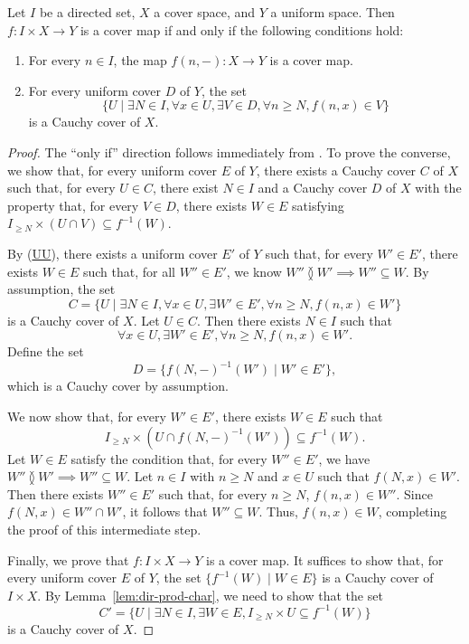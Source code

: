 \documentclass[pdflatex,sn-mathphys-num]{sn-jnl}
\newcommand{\axref}[1]{(\hyperref[ax:#1]{#1})}
\theoremstyle{definition}
\theoremstyle{remark}
\numberwithin{figure}{section}
\newcommand{\overlap}[2]{#1 \between #2}
\begin{document}
\begin{prop}
Let $I$ be a directed set, $X$ a cover space, and $Y$ a uniform space.
Then $f : I \times X \to Y$ is a cover map if and only if the following conditions hold:
\begin{enumerate}
\item For every $n \in I$, the map $f(n, -) : X \to Y$ is a cover map.
\item For every uniform cover $D$ of $Y$, the set
        \[ \{ U \mid \exists N \in I, \forall x \in U, \exists V \in D, \forall n \geq N, f(n, x) \in V \} \]
        is a Cauchy cover of $X$.
\end{enumerate}
\end{prop}
\begin{proof}
The ``only if'' direction follows immediately from .
To prove the converse, we show that, for every uniform cover $E$ of $Y$, there exists a Cauchy cover $C$ of $X$ such that, for every $U \in C$,
there exist $N \in I$ and a Cauchy cover $D$ of $X$ with the property that, for every $V \in D$, there exists $W \in E$ satisfying
$I_{\geq N} \times (U \cap V) \subseteq f^{-1}(W)$.

By \axref{UU}, there exists a uniform cover $E'$ of $Y$ such that, for every $W' \in E'$, there exists $W \in E$ such that, for all $W'' \in E'$, we know $\overlap{W''}{W'} \implies W'' \subseteq W$.
By assumption, the set
\[ C = \{ U \mid \exists N \in I, \forall x \in U, \exists W' \in E', \forall n \geq N, f(n, x) \in W' \} \]
is a Cauchy cover of $X$.
Let $U \in C$.
Then there exists $N \in I$ such that
\[ \forall x \in U, \exists W' \in E', \forall n \geq N, f(n, x) \in W'. \]
Define the set
\[ D = \{ f(N, -)^{-1}(W') \mid W' \in E' \}, \]
which is a Cauchy cover by assumption.

We now show that, for every $W' \in E'$, there exists $W \in E$ such that
\[ I_{\geq N} \times (U \cap f(N, -)^{-1}(W')) \subseteq f^{-1}(W). \]
Let $W \in E$ satisfy the condition that, for every $W'' \in E'$, we have
$\overlap{W''}{W'} \implies W'' \subseteq W$.
Let $n \in I$ with $n \geq N$ and $x \in U$ such that $f(N, x) \in W'$. Then there exists $W'' \in E'$ such that, for every $n \geq N$, $f(n, x) \in W''$.
Since $f(N, x) \in W'' \cap W'$, it follows that $W'' \subseteq W$. Thus, $f(n, x) \in W$, completing the proof of this intermediate step.

Finally, we prove that $f : I \times X \to Y$ is a cover map.
It suffices to show that, for every uniform cover $E$ of $Y$, the set $\{ f^{-1}(W) \mid W \in E \}$ is a Cauchy cover of $I \times X$.
By Lemma~\ref{lem:dir-prod-char}, we need to show that the set
\[
C' = \{ U \mid \exists N \in I, \exists W \in E, I_{\geq N} \times U \subseteq f^{-1}(W) \}
\]
is a Cauchy cover of $X$.


\end{proof}
\end{document}
